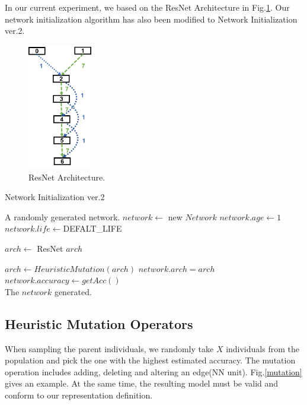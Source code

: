 \documentclass[conference]{IEEEtran}
\begin{document}
In our current experiment, we based on the ResNet Architecture in Fig.\ref{resnet}. Our network initialization algorithm has also been modified to Network Initialization ver.2.
\begin{figure}[H]
	\centering
	\includegraphics[width=0.25\textwidth]{figures/fig_resnet.png}
	\caption{ResNet Architecture.}\label{fig:digit}
	\label{resnet}
\end{figure}

 \begin{algorithm}[H]  
	\caption{ Network Initialization ver.2}
	
	
	\begin{algorithmic}[1]  
		\Ensure A randomly generated network.
		\State $network\gets $ new $Network$
		\State $network.age\gets1$
		\State $network.life\gets $DEFALT\_LIFE 
		
		\State $arch\gets $ ResNet $ arch$ 
		
		\State $arch\gets HeuristicMutation(arch)$
		\State $network.arch=arch$
		\State $network.accuracy\gets getAcc()$
		\\
		\Return The $network$ generated.
		
	\end{algorithmic}  
\end{algorithm}  

  \subsection{Heuristic Mutation Operators}
  When sampling the parent individuals, we randomly take $X$ individuals from the population and pick the one with the highest estimated accuracy. The mutation operation includes adding, deleting and altering an edge(NN unit). Fig.\ref{mutation} gives an example. At the same time, the resulting model must be valid and conform to our representation definition. 
  
\end{document}

